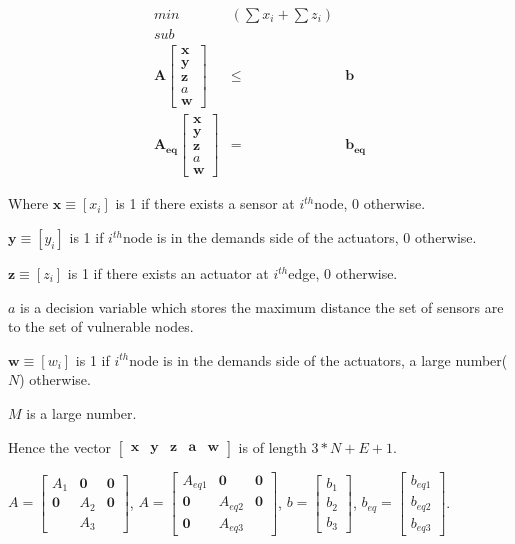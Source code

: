 \documentclass[authoryear,preprint,review,12pt]{elsarticle}
\begin{document}
\begin{eqnarray*}
min & (\sum x_{i}+\sum z_{i})\\
sub\\
\mathbf{A}\left[\begin{array}{c}
\mathbf{x}\\
\mathbf{y}\\
\mathbf{z}\\
a\\
\mathbf{w}
\end{array}\right] & \leq & \mathbf{b}\\
\mathbf{A_{eq}}\left[\begin{array}{c}
\mathbf{x}\\
\mathbf{y}\\
\mathbf{z}\\
a\\
\mathbf{w}
\end{array}\right] & = & \mathbf{b_{eq}}
\end{eqnarray*}


Where $\mathbf{x}\equiv[x_{i}]$ is 1 if there exists a sensor at
$i^{th}$node, 0 otherwise.

$\mathbf{y}\equiv[y_{i}]$ is 1 if $i^{th}$node is in the demands
side of the actuators, 0 otherwise.

$\mathbf{z}\equiv[z_{i}]$ is 1 if there exists an actuator at $i^{th}$edge,
0 otherwise.

$a$ is a decision variable which stores the maximum distance the
set of sensors are to the set of vulnerable nodes.

$\mathbf{w}\equiv[w_{i}]$ is 1 if $i^{th}$node is in the demands
side of the actuators, a large number($N$) otherwise.

$M$ is a large number.

Hence the vector $\left[\mathbf{\begin{array}{ccccc}
\mathbf{x} & y & z & a & w\end{array}}\right]$ is of length $3*N+E+1$.

$A=\left[\begin{array}{ccc}
A_{1} & \mathbf{0} & \mathbf{0}\\
\mathbf{0} & A_{2} & \mathbf{0}\\
\mathbf{} & A_{3}
\end{array}\right]$, $A=\left[\begin{array}{ccc}
A_{eq1} & \mathbf{0} & \mathbf{0}\\
\mathbf{0} & A_{eq2} & \mathbf{0}\\
\mathbf{0} & A_{eq3}
\end{array}\right]$, $b=\left[\begin{array}{c}
b_{1}\\
b_{2}\\
b_{3}
\end{array}\right]$, $b_{eq}=\left[\begin{array}{c}
b_{eq1}\\
b_{eq2}\\
b_{eq3}
\end{array}\right]$.\\
\end{document}
